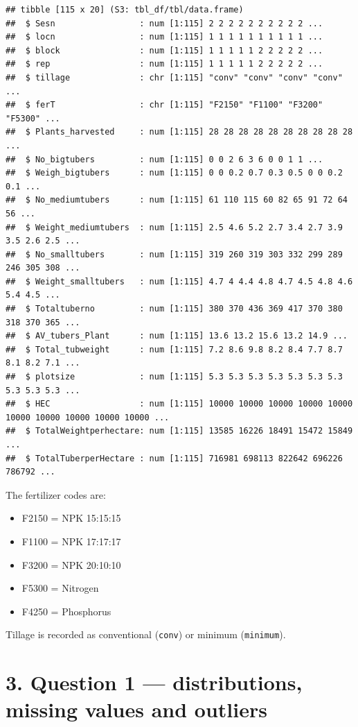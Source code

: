 \documentclass[
]{article}
\providecommand{\tightlist}{%
  \setlength{\itemsep}{0pt}\setlength{\parskip}{0pt}}
\begin{document}
\begin{verbatim}
## tibble [115 x 20] (S3: tbl_df/tbl/data.frame)
##  $ Sesn                 : num [1:115] 2 2 2 2 2 2 2 2 2 2 ...
##  $ locn                 : num [1:115] 1 1 1 1 1 1 1 1 1 1 ...
##  $ block                : num [1:115] 1 1 1 1 1 2 2 2 2 2 ...
##  $ rep                  : num [1:115] 1 1 1 1 1 2 2 2 2 2 ...
##  $ tillage              : chr [1:115] "conv" "conv" "conv" "conv" ...
##  $ ferT                 : chr [1:115] "F2150" "F1100" "F3200" "F5300" ...
##  $ Plants_harvested     : num [1:115] 28 28 28 28 28 28 28 28 28 28 ...
##  $ No_bigtubers         : num [1:115] 0 0 2 6 3 6 0 0 1 1 ...
##  $ Weigh_bigtubers      : num [1:115] 0 0 0.2 0.7 0.3 0.5 0 0 0.2 0.1 ...
##  $ No_mediumtubers      : num [1:115] 61 110 115 60 82 65 91 72 64 56 ...
##  $ Weight_mediumtubers  : num [1:115] 2.5 4.6 5.2 2.7 3.4 2.7 3.9 3.5 2.6 2.5 ...
##  $ No_smalltubers       : num [1:115] 319 260 319 303 332 299 289 246 305 308 ...
##  $ Weight_smalltubers   : num [1:115] 4.7 4 4.4 4.8 4.7 4.5 4.8 4.6 5.4 4.5 ...
##  $ Totaltuberno         : num [1:115] 380 370 436 369 417 370 380 318 370 365 ...
##  $ AV_tubers_Plant      : num [1:115] 13.6 13.2 15.6 13.2 14.9 ...
##  $ Total_tubweight      : num [1:115] 7.2 8.6 9.8 8.2 8.4 7.7 8.7 8.1 8.2 7.1 ...
##  $ plotsize             : num [1:115] 5.3 5.3 5.3 5.3 5.3 5.3 5.3 5.3 5.3 5.3 ...
##  $ HEC                  : num [1:115] 10000 10000 10000 10000 10000 10000 10000 10000 10000 10000 ...
##  $ TotalWeightperhectare: num [1:115] 13585 16226 18491 15472 15849 ...
##  $ TotalTuberperHectare : num [1:115] 716981 698113 822642 696226 786792 ...
\end{verbatim}

The fertilizer codes are:

\begin{itemize}
\tightlist
\item
  F2150 = NPK 15:15:15
\item
  F1100 = NPK 17:17:17
\item
  F3200 = NPK 20:10:10
\item
  F5300 = Nitrogen
\item
  F4250 = Phosphorus
\end{itemize}

Tillage is recorded as conventional (\texttt{conv}) or minimum
(\texttt{minimum}).

\section{3. Question 1 --- distributions, missing values and
outliers}\label{question-1-distributions-missing-values-and-outliers}
\end{document}

